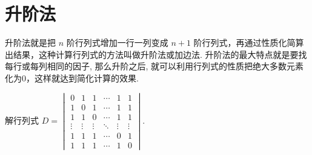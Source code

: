 \section{升阶法}

升阶法就是把 $n$ 阶行列式增加一行一列变成 $n+1$ 阶行列式，再通过性质化简算出结果，这种计算行列式的方法叫做升阶法或加边法. 升阶法的最大特点就是要找每行或每列相同的因子, 那么升阶之后, 就可以利用行列式的性质把绝大多数元素化为0，这样就达到简化计算的效果.

\begin{example}
    解行列式 $D=\begin{vmatrix}
            0      & 1      & 1      & \cdots & 1      & 1      \\
            1      & 0      & 1      & \cdots & 1      & 1      \\
            1      & 1      & 0      & \cdots & 1      & 1      \\
            \vdots & \vdots & \vdots & \ddots & \vdots & \vdots \\
            1      & 1      & 1      & \cdots & 0      & 1      \\
            1      & 1      & 1      & \cdots & 1      & 0
        \end{vmatrix}$.
\end{example}

